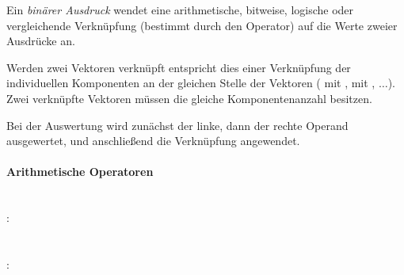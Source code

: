 Ein \emph{binärer Ausdruck} wendet eine arithmetische, bitweise, logische oder vergleichende Verknüpfung
(bestimmt durch den Operator) auf die Werte zweier Ausdrücke an.

Werden zwei Vektoren verknüpft entspricht dies einer Verknüpfung der individuellen Komponenten an der gleichen
Stelle der Vektoren ( mit ,  mit , $\dots$). Zwei verknüpfte Vektoren müssen
die gleiche Komponentenanzahl besitzen.

Bei der Auswertung wird zunächst der linke, dann der rechte Operand ausgewertet, und an\-schließend die Verknüpfung angewendet.

\paragraph{Arithmetische Operatoren}\label{Arithmetische Operatoren}
~\\
:\label{asdr_mult}\\
\hspace*{1cm} \\
\hspace*{1cm}  \\
:\label{asdr_mult_operanden}\\
\hspace*{1cm}\glq\Gt{*}\grq  {} \\
\hspace*{1cm}\glq\Gt{*}\grq  {}  \\
\hspace*{1cm}\glq\Gt{/}\grq  {} \\
\hspace*{1cm}\glq\Gt{/}\grq  {}  \\
\hspace*{1cm}\glq\Gt{\%}\grq  {} \\
\hspace*{1cm}\glq\Gt{\%}\grq  {}  \\
